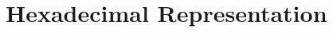 \documentclass[../main.tex]{subfiles}
\begin{document}
    \section{Hexadecimal Representation}
\end{document}

